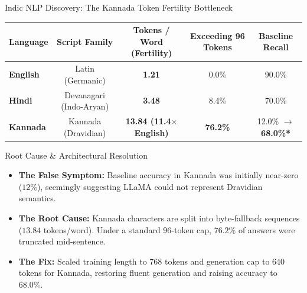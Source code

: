 \documentclass[aspectratio=169,10pt]{beamer}
\begin{document}
\begin{frame}{Indic NLP Discovery: The Kannada Token Fertility Bottleneck}
  \small
  \begin{table}[H]
    \centering\scriptsize
    \begin{tabular}{lcccc}
      \toprule
      \textbf{Language} & \textbf{Script Family} & \textbf{Tokens / Word (Fertility)} & \textbf{Exceeding 96 Tokens} & \textbf{Baseline Recall} \\
      \midrule
      \textbf{English} & Latin (Germanic) & \textbf{1.21} & 0.0\% & 90.0\% \\
      \textbf{Hindi} & Devanagari (Indo-Aryan) & \textbf{3.48} & 8.4\% & 70.0\% \\
      \textbf{Kannada} & Kannada (Dravidian) & \textbf{13.84 (11.4$\times$ English)} & \textbf{76.2\%} & 12.0\% $\to$ \textbf{68.0\%*} \\
      \bottomrule
    \end{tabular}
  \end{table}
  \vspace{0.3em}
  \begin{block}{Root Cause & Architectural Resolution}
    \begin{itemize}\scriptsize
      \item \textbf{The False Symptom:} Baseline accuracy in Kannada was initially near-zero ($12\%$), seemingly suggesting LLaMA could not represent Dravidian semantics.
      \item \textbf{The Root Cause:} Kannada characters are split into byte-fallback sequences ($13.84$ tokens/word). Under a standard 96-token cap, $76.2\%$ of answers were truncated mid-sentence.
      \item \textbf{The Fix:} Scaled training length to 768 tokens and generation cap to 640 tokens for Kannada, restoring fluent generation and raising accuracy to 68.0\%.
    \end{itemize}
  \end{block}
\end{frame}
\end{document}
